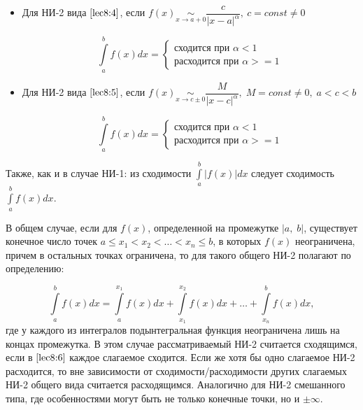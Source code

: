 \documentclass[../../main.tex]{subfiles}
\begin{document}
\begin{enumerate}
\begin{itemize}
\item Для НИ-2 вида $\eqref{lec8:4}$, если $f(x) \underset{x \to a + 0}\sim 
\dfrac{c}{\left|x - a\right|^{\alpha}}, \ c = const \neq 0$

\[\int\limits_{a}^{b}f(x)dx = \begin{cases}
                               \text{сходится при } \alpha < 1\\
                               \text{расходится при } \alpha >= 1
                              \end{cases}
\]                                                    
                                                    
\item Для НИ-2 вида $\eqref{lec8:5}$, если $f(x) \underset{x \to c \pm 
0}\sim \dfrac{M}{\left|x - c\right|^{\alpha}}, \; M = const \neq 0,\; a < c < 
b$

\[\int\limits_{a}^{b}f(x)dx = \begin{cases}
                               \text{сходится при } \alpha < 1\\
                               \text{расходится при } \alpha >= 1
                              \end{cases}
\]
 \end{itemize}
\end{enumerate}


Также, как и в случае НИ-1: из сходимости 
$\displaystyle\int\limits_{a}^{b}\left|f(x)\right|dx$ следует сходимость 
$\displaystyle\int\limits_{a}^{b}f(x)dx$.

В общем случае, если для $f(x)$, определенной на промежутке $\left|a, \; 
b\right|$, существует конечное число точек $a \leq x_1 < x_2 < \ldots < x_n 
\leq b$, в которых $f(x)$ неограничена, причем в остальных точках 
ограничена, то для такого общего НИ-2 полагают по определению:

\begin{equation} \label{lec8:6}
\int\limits_{a}^{b}f(x)dx = \int\limits_{a}^{x_1}f(x)dx + 
\int\limits_{x_1}^{x_2}f(x)dx + \ldots + \int\limits_{x_n}^{b}f(x)dx,
\end{equation}
где у каждого из интегралов подынтегральная функция неограничена лишь на 
концах промежутка. В этом случае рассматриваемый НИ-2 считается сходящимся, 
если в $\eqref{lec8:6}$ каждое слагаемое сходится. Если же хотя бы одно 
слагаемое НИ-2 расходится, то вне зависимости от сходимости/расходимости 
других слагаемых НИ-2 общего вида считается расходящимся. Аналогично для НИ-2 
смешанного типа, где особенностями могут быть не только конечные точки, но и 
$\pm\infty$.
\end{document}

